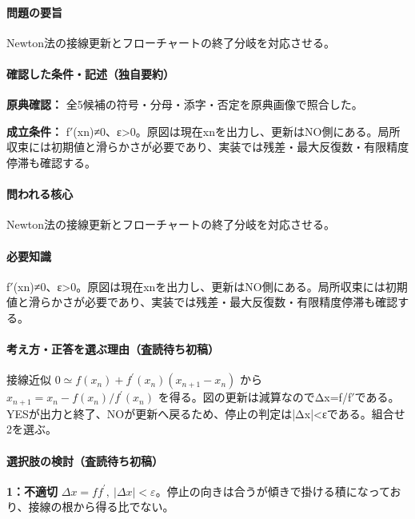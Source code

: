 \paragraph{問題の要旨} Newton法の接線更新とフローチャートの終了分岐を対応させる。

\paragraph{確認した条件・記述（独自要約）}\mbox{}\par

\noindent\textbf{原典確認：} 全5候補の符号・分母・添字・否定を原典画像で照合した。\par

\noindent\textbf{成立条件：} f\ensuremath{'}(xn)≠0、ε>0。原図は現在xnを出力し、更新はNO側にある。局所収束には初期値と滑らかさが必要であり、実装では残差・最大反復数・有限精度停滞も確認する。\par

\paragraph{問われる核心} Newton法の接線更新とフローチャートの終了分岐を対応させる。

\paragraph{必要知識} f\ensuremath{'}(xn)≠0、ε>0。原図は現在xnを出力し、更新はNO側にある。局所収束には初期値と滑らかさが必要であり、実装では残差・最大反復数・有限精度停滞も確認する。

\paragraph{考え方・正答を選ぶ理由（査読待ち初稿）} 接線近似 \(0\simeq f(x_n)+f^\prime(x_n)(x_{n+1}-x_n)\) から \(x_{n+1}=x_n-f(x_n)/f^\prime(x_n)\) を得る。図の更新は減算なのでΔx=\allowbreak{}f/f\ensuremath{'}である。YESが出力と終了、NOが更新へ戻るため、停止の判定は|Δx|<εである。組合せ2を選ぶ。

\paragraph{選択肢の検討（査読待ち初稿）}\mbox{}\par

\noindent\textbf{1：不適切} \(\Delta x=ff^\prime,\ |\Delta x|<\varepsilon\)。停止の向きは合うが傾きで掛ける積になっており、接線の根から得る比でない。\par

